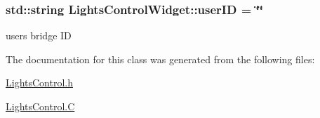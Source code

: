 \subsubsection[{\texorpdfstring{user\+ID}{userID}}]{\setlength{\rightskip}{0pt plus 5cm}std\+::string Lights\+Control\+Widget\+::user\+ID = \char`\"{}\char`\"{}\hspace{0.3cm}{\ttfamily [private]}}\hypertarget{classLightsControlWidget_aa26d4553e677dec57b64575a6d6d8558}{}\label{classLightsControlWidget_aa26d4553e677dec57b64575a6d6d8558}
user\textquotesingle{}s bridge ID 

The documentation for this class was generated from the following files\+:\begin{DoxyCompactItemize}
\item 
\hyperlink{LightsControl_8h}{Lights\+Control.\+h}\item 
\hyperlink{LightsControl_8C}{Lights\+Control.\+C}\end{DoxyCompactItemize}
